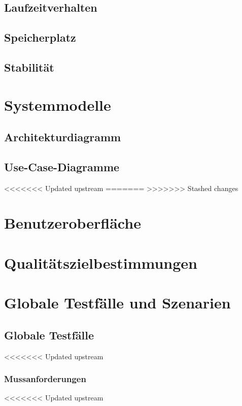 \documentclass[a4paper,12pt]{article}
\begin{document}
\begin{itemize}
\subsection{Laufzeitverhalten}
\subsection{Speicherplatz}
\subsection{Stabilität}

\section{Systemmodelle}
  \subsection{Architekturdiagramm}
  \subsection{Use-Case-Diagramme}
\begin{center}
<<<<<<< Updated upstream
=======
>>>>>>> Stashed changes
\end{center}
\section{Benutzeroberfläche}
\section{Qualitätszielbestimmungen}
\section{Globale Testfälle und Szenarien}
  \subsection{Globale Testfälle}
<<<<<<< Updated upstream
  \subsubsection{Mussanforderungen}
<<<<<<< Updated upstream

\end{itemize}
\end{document}
